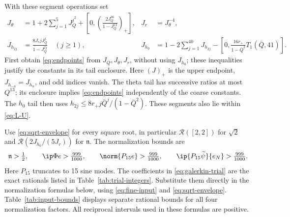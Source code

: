With these segment operations set
\begin{equation}\label{eq:fine-input}
\begin{aligned}
 J_\theta&=1+2\sum_{j=1}^{5}J_Q^{j^2}
 +\left[0,\left(\frac{2J_Q^{36}}{1-J_Q^{13}}\right)_+\right],
 &J_r&=J_\theta^{-4},\\
 J_{h_{2j}}&=\frac{8J_rjJ_Q^j}{1-J_Q^{2j}}\quad(j\ge1),
 &J_{h_0}&=1-2\sum_{j=1}^{40}J_{h_{2j}}
 -\left[0,\frac{16r_+}{1-\bar Q^2}T_1(\bar Q,41)\right].
\end{aligned}
\end{equation}
First obtain \eqref{eq:endpoints} from $J_Q,J_\theta,J_r$, without using $J_{h_0}$; these inequalities justify the constants in its tail enclosure. Here $(J)_+$ is the upper endpoint, $J_{h_{-n}}=J_{h_n}$, and odd indices vanish. The theta tail has successive ratios at most $Q^{13}$; its enclosure implies \eqref{eq:endpoints} independently of the coarse constants. The $h_0$ tail then uses $h_{2j}\le8r_+j\bar Q^j/(1-\bar Q^2)$. These segments also lie within \eqref{eq:L-U}.

Use \eqref{eq:sqrt-envelope} for every square root, in particular $\mathcal R([2,2])$ for $\sqrt2$ and $\mathcal R(2J_{h_0}/(5J_r))$ for $\mathfrak n$. The normalization bounds are
\[
 \mathfrak n>\tfrac12,\qquad
 \ip\Phi e>\tfrac{999}{1000},\qquad
 \norm{P_{15}e}>\tfrac{999}{1000},\qquad
 \ip{P_{15}\widetilde\psi}{e_N}>\tfrac{999}{1000}.
\]
Here $P_{15}$ truncates to 15 sine modes. The coefficients in \eqref{eq:galerkin-trial} are the exact rationals listed in Table~\ref{tab:trial-integers}. Substitute them directly in the normalization formulas below, using \eqref{eq:fine-input} and \eqref{eq:sqrt-envelope}. Table~\ref{tab:input-bounds} displays separate rational bounds for all four normalization factors. All reciprocal intervals used in these formulas are positive.

